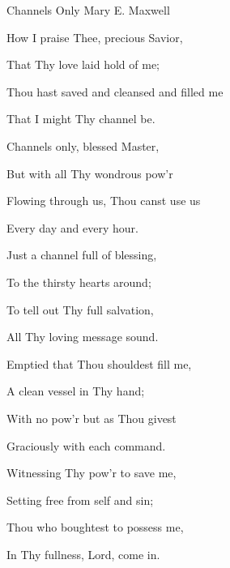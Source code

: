 \documentclass[12pt]{book}
\begin{document}
\begin{song}{Channels Only}{}
  {\SBPubDom}
  {Mary E. Maxwell}
  {}
  {}

  \begin{SBVerse}
    How I praise Thee, precious Savior,

    That Thy love laid hold of me;

    Thou hast saved and cleansed and filled me

    That I might Thy channel be.
  \end{SBVerse}

  \begin{SBOpGroup}
    Channels only, blessed Master,

    But with all Thy wondrous pow'r

    Flowing through us, Thou canst use us

    Every day and every hour.
  \end{SBOpGroup}

  \begin{SBVerse}
    Just a channel full of blessing,

    To the thirsty hearts around;

    To tell out Thy full salvation,

    All Thy loving message sound.
  \end{SBVerse}

  \begin{SBVerse}
    Emptied that Thou shouldest fill me,

    A clean vessel in Thy hand;

    With no pow'r but as Thou givest

    Graciously with each command.
  \end{SBVerse}

  \begin{SBVerse}
    Witnessing Thy pow'r to save me,

    Setting free from self and sin;

    Thou who boughtest to possess me,

    In Thy fullness, Lord, come in.
  \end{SBVerse}

\end{song}
\end{document}
